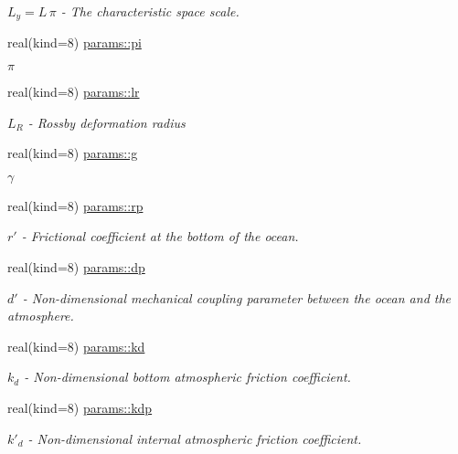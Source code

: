 \begin{DoxyCompactItemize}
\begin{DoxyCompactList}\small\item\em $L_y = L \, \pi$ -\/ The characteristic space scale. \end{DoxyCompactList}\item 
real(kind=8) \hyperlink{namespaceparams_aaed8cf35d6e94ec5a9aeab80125e470f}{params\+::pi}
\begin{DoxyCompactList}\small\item\em $\pi$ \end{DoxyCompactList}\item 
real(kind=8) \hyperlink{namespaceparams_a3082530044275cbd794604b81a7e6be0}{params\+::lr}
\begin{DoxyCompactList}\small\item\em $L_R$ -\/ Rossby deformation radius \end{DoxyCompactList}\item 
real(kind=8) \hyperlink{namespaceparams_afb5953f2f72e02fa67d474979127e79d}{params\+::g}
\begin{DoxyCompactList}\small\item\em $\gamma$ \end{DoxyCompactList}\item 
real(kind=8) \hyperlink{namespaceparams_ae93d91e6b6dbca141006f84d1c467921}{params\+::rp}
\begin{DoxyCompactList}\small\item\em $r'$ -\/ Frictional coefficient at the bottom of the ocean. \end{DoxyCompactList}\item 
real(kind=8) \hyperlink{namespaceparams_aee7fb664acd19367183ac09fdfe5ebe0}{params\+::dp}
\begin{DoxyCompactList}\small\item\em $d'$ -\/ Non-\/dimensional mechanical coupling parameter between the ocean and the atmosphere. \end{DoxyCompactList}\item 
real(kind=8) \hyperlink{namespaceparams_ae9bae2195091caeb7918dcbc3e57f109}{params\+::kd}
\begin{DoxyCompactList}\small\item\em $k_d$ -\/ Non-\/dimensional bottom atmospheric friction coefficient. \end{DoxyCompactList}\item 
real(kind=8) \hyperlink{namespaceparams_a764d9607a4fdabf5e51f36e90fd7e568}{params\+::kdp}
\begin{DoxyCompactList}\small\item\em $k'_d$ -\/ Non-\/dimensional internal atmospheric friction coefficient. \end{DoxyCompactList}\item 

\end{DoxyCompactItemize}
